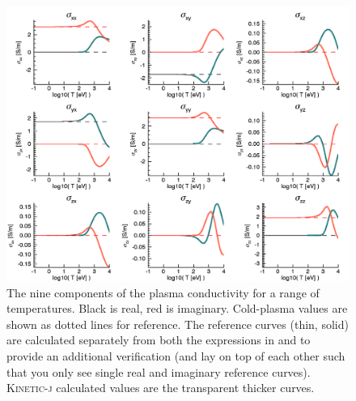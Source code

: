 \documentclass[final,5p,times,twocolumn]{elsarticle}
\newcommand{\kj}{\textsc{Kinetic-j}\xspace}
\begin{document}
\begin{figure}
\centering
\includegraphics[]{figures/benchmark1}
\caption{\label{fig:b1}The nine components of the plasma conductivity for a range of temperatures. Black is real, red is imaginary. Cold-plasma values are shown as dotted lines for reference. The reference curves (thin, solid) are calculated separately from both the expressions in \cite{brambilla} and \cite{swanson} to provide an additional verification (and lay on top of each other such that you only see single real and imaginary reference curves). \kj calculated values are the transparent thicker curves.}
\end{figure}
%
\end{document}
